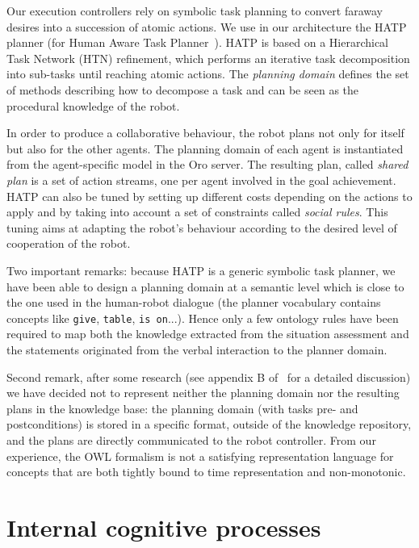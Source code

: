 \documentclass[letterpaper, 10 pt, conference]{ieeeconf}  %
\begin{document}
Our execution controllers rely on symbolic task planning to convert faraway
desires into a succession of atomic actions. We use in our architecture the
HATP planner (for Human Aware Task Planner~\cite{Alili2009}).  HATP is based on
a Hierarchical Task Network (HTN) refinement, which performs an iterative task
decomposition into sub-tasks until reaching atomic actions.  The \emph{planning
domain} defines the set of methods describing how to decompose a task and can
be seen as the procedural knowledge of the robot.

In order to produce a collaborative behaviour, the robot plans not only for
itself but also for the other agents. The planning domain of each agent is
instantiated from the agent-specific model in the {\sc Oro} server. The resulting
plan, called \emph{shared plan} is a set of action streams, one per
agent involved in the goal achievement. HATP can also be tuned by setting up
different costs depending on the actions to apply and by taking into account a
set of constraints called \emph{social rules}. This tuning aims at adapting the
robot's behaviour according to the desired level of cooperation of the robot.


Two important remarks: because HATP is a generic symbolic task planner, we have
been able to design a planning domain at a semantic level which is close to the
one used in the human-robot dialogue (the planner vocabulary contains concepts
like \texttt{give}, \texttt{table}, \texttt{is on}...). Hence only a few
ontology rules have been required to map both the knowledge extracted from the
situation assessment and the statements originated from the verbal interaction
to the planner domain.

Second remark, after some research (see appendix B of~\cite{Lemaignan2012a} for
a detailed discussion)  we have decided not to represent neither the planning
domain nor the resulting plans in the knowledge base: the planning domain (with
tasks pre- and postconditions) is stored in a specific format, outside of the
knowledge repository, and the plans are directly communicated to the robot
controller. From our experience, the OWL formalism is not a satisfying
representation language for concepts that are both tightly bound to time
representation and non-monotonic.


\section{Internal cognitive processes}
\label{sect|intern}
\end{document}
